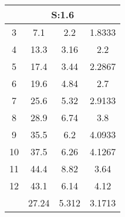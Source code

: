 
	\begin{table}[H]
		\begin{tabular}{c|ccc}
			\multicolumn{4}{c}{S:1.6}\\\hline
			3 & 7.1 & 2.2 & 1.8333\\
			4 & 13.3 & 3.16 & 2.2\\
			5 & 17.4 & 3.44 & 2.2867\\
			6 & 19.6 & 4.84 & 2.7\\
			7 & 25.6 & 5.32 & 2.9133\\
			8 & 28.9 & 6.74 & 3.8\\
			9 & 35.5 & 6.2 & 4.0933\\
			10 & 37.5 & 6.26 & 4.1267\\
			11 & 44.4 & 8.82 & 3.64\\
			12 & 43.1 & 6.14 & 4.12\\
			\hline
			& 27.24 & 5.312 & 3.1713\\
		\end{tabular}
	\end{table}